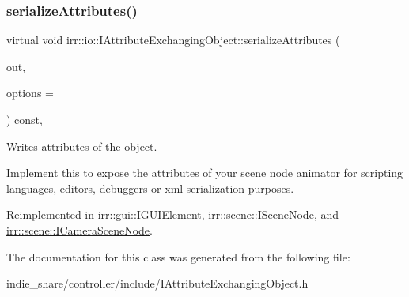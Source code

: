 \mbox{\label{classirr_1_1io_1_1IAttributeExchangingObject_a587f7b633366968f0488e1099e9172ef}} 
\subsubsection{\texorpdfstring{serialize\+Attributes()}{serializeAttributes()}}
{\footnotesize\ttfamily virtual void irr\+::io\+::\+I\+Attribute\+Exchanging\+Object\+::serialize\+Attributes (\begin{DoxyParamCaption}\item[{\hyperlink{classirr_1_1io_1_1IAttributes}{io\+::\+I\+Attributes} $\ast$}]{out,  }\item[{\hyperlink{structirr_1_1io_1_1SAttributeReadWriteOptions}{io\+::\+S\+Attribute\+Read\+Write\+Options} $\ast$}]{options = {} }\end{DoxyParamCaption}) const\hspace{0.3cm}{\ttfamily [inline]}, {\ttfamily [virtual]}}



Writes attributes of the object. 

Implement this to expose the attributes of your scene node animator for scripting languages, editors, debuggers or xml serialization purposes. 

Reimplemented in \hyperlink{classirr_1_1gui_1_1IGUIElement_ac575f2f817b05733dbc667ff298f6e78}{irr\+::gui\+::\+I\+G\+U\+I\+Element}, \hyperlink{classirr_1_1scene_1_1ISceneNode_a3210345b70227c03c7f889c94754fdaa}{irr\+::scene\+::\+I\+Scene\+Node}, and \hyperlink{classirr_1_1scene_1_1ICameraSceneNode_a0a78a29638be1665ee5dba22c2c3b846}{irr\+::scene\+::\+I\+Camera\+Scene\+Node}.



The documentation for this class was generated from the following file\+:\begin{DoxyCompactItemize}
\item 
indie\+\_\+share/controller/include/I\+Attribute\+Exchanging\+Object.\+h\end{DoxyCompactItemize}
